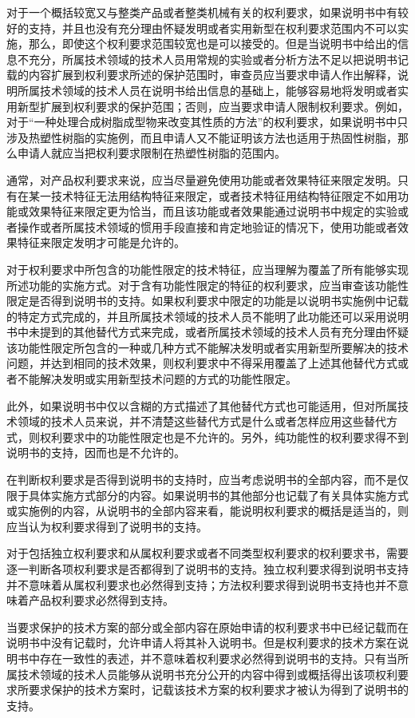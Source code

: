 对于一个概括较宽又与整类产品或者整类机械有关的权利要求，如果说明书中有较好的支持，并且也没有充分理由怀疑发明或者实用新型在权利要求范围内不可以实施，那么，即使这个权利要求范围较宽也是可以接受的。但是当说明书中给出的信息不充分，所属技术领域的技术人员用常规的实验或者分析方法不足以把说明书记载的内容扩展到权利要求所述的保护范围时，审查员应当要求申请人作出解释，说明所属技术领域的技术人员在说明书给出信息的基础上，能够容易地将发明或者实用新型扩展到权利要求的保护范围；否则，应当要求申请人限制权利要求。例如，对于“一种处理合成树脂成型物来改变其性质的方法”的权利要求，如果说明书中只涉及热塑性树脂的实施例，而且申请人又不能证明该方法也适用于热固性树脂，那么申请人就应当把权利要求限制在热塑性树脂的范围内。

通常，对产品权利要求来说，应当尽量避免使用功能或者效果特征来限定发明。只有在某一技术特征无法用结构特征来限定，或者技术特征用结构特征限定不如用功能或效果特征来限定更为恰当，而且该功能或者效果能通过说明书中规定的实验或者操作或者所属技术领域的惯用手段直接和肯定地验证的情况下，使用功能或者效果特征来限定发明才可能是允许的。

对于权利要求中所包含的功能性限定的技术特征，应当理解为覆盖了所有能够实现所述功能的实施方式。对于含有功能性限定的特征的权利要求，应当审查该功能性限定是否得到说明书的支持。如果权利要求中限定的功能是以说明书实施例中记载的特定方式完成的，并且所属技术领域的技术人员不能明了此功能还可以采用说明书中未提到的其他替代方式来完成，或者所属技术领域的技术人员有充分理由怀疑该功能性限定所包含的一种或几种方式不能解决发明或者实用新型所要解决的技术问题，并达到相同的技术效果，则权利要求中不得采用覆盖了上述其他替代方式或者不能解决发明或实用新型技术问题的方式的功能性限定。

此外，如果说明书中仅以含糊的方式描述了其他替代方式也可能适用，但对所属技术领域的技术人员来说，并不清楚这些替代方式是什么或者怎样应用这些替代方式，则权利要求中的功能性限定也是不允许的。另外，纯功能性的权利要求得不到说明书的支持，因而也是不允许的。

在判断权利要求是否得到说明书的支持时，应当考虑说明书的全部内容，而不是仅限于具体实施方式部分的内容。如果说明书的其他部分也记载了有关具体实施方式或实施例的内容，从说明书的全部内容来看，能说明权利要求的概括是适当的，则应当认为权利要求得到了说明书的支持。

对于包括独立权利要求和从属权利要求或者不同类型权利要求的权利要求书，需要逐一判断各项权利要求是否都得到了说明书的支持。独立权利要求得到说明书支持并不意味着从属权利要求也必然得到支持；方法权利要求得到说明书支持也并不意味着产品权利要求必然得到支持。

当要求保护的技术方案的部分或全部内容在原始申请的权利要求书中已经记载而在说明书中没有记载时，允许申请人将其补入说明书。但是权利要求的技术方案在说明书中存在一致性的表述，并不意味着权利要求必然得到说明书的支持。只有当所属技术领域的技术人员能够从说明书充分公开的内容中得到或概括得出该项权利要求所要求保护的技术方案时，记载该技术方案的权利要求才被认为得到了说明书的支持。

